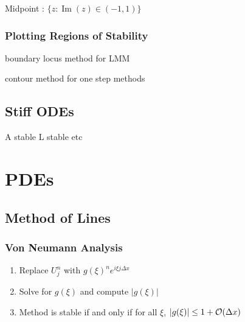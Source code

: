 \documentclass[12pt]{article}
\begin{document}
Midpoint : \( \{ z : \operatorname{Im}(z) \in (-1,1) \} \)


\subsubsection{Plotting Regions of Stability}

boundary locus method for LMM

contour method for one step methods

\subsection{Stiff ODEs}

A stable L stable etc

\section{PDEs}
\subsection{Method of Lines}

\subsubsection{Von Neumann Analysis}

\begin{enumerate}[nolistsep]
    \item Replace \( U_j^n \) with \( g(\xi)^n e^{i\xi j \Delta x} \)
    \item Solve for \( g(\xi) \) and compute \( |g(\xi)| \)
    \item Method is stable if and only if for all \( \xi \), \( |g(\xi)| \leq 1+\mathcal{O}(\Delta x) \)
\end{enumerate}
\end{document}
